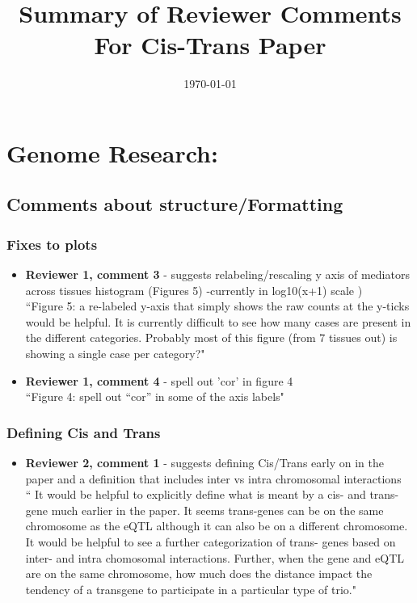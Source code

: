 \documentclass[a4paper,12pt]{article}
\title{Summary of Reviewer Comments For Cis-Trans Paper}
\date{\today}
\begin{document}
	\section*{Genome Research:}
	\subsection*{Comments about structure/Formatting}
	\subsubsection*{Fixes to plots}
	
	\begin{itemize}
		
		\item \textbf{Reviewer 1, comment 3} - suggests relabeling/rescaling y axis of mediators across tissues histogram (Figures 5) -currently in log10(x+1) scale )\\
		
		``Figure 5: a re-labeled y-axis that simply shows the raw counts at the y-ticks would be helpful. It is currently difficult to
		see how many cases are present in the different categories. Probably most of this figure (from 7 tissues out) is showing a
		single case per category?"
		
		\item \textbf{Reviewer 1, comment 4} - spell out 'cor' in figure 4 \\
		
		``Figure 4: spell out “cor” in some of the axis labels"
		 
	\end{itemize}
	
	
	\subsubsection*{Defining Cis and Trans}
	\begin{itemize}

		\item \textbf{Reviewer 2, comment 1} - suggests defining Cis/Trans early on in the paper and a definition that includes inter vs intra chromosomal interactions\\
		
		`` It would be helpful to explicitly define what is meant by a cis- and trans- gene much earlier in the paper. It seems trans-genes can be on the same chromosome as the eQTL although it can also be on a different chromosome. It would be helpful to see a further categorization of trans- genes based on inter- and intra chomosomal interactions. Further, when the gene and eQTL are on the same chromosome, how much does the distance impact the tendency of a transgene to participate in a particular type of trio."

	\end{itemize}
	
\end{document}
